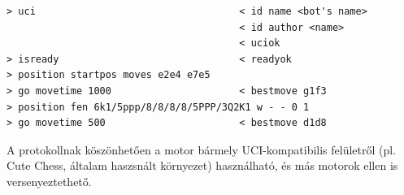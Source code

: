 \begin{lstlisting}[caption={UCI munkamenet (bemenet és a motor válaszai)}, label={lst:uci}]
> uci                                   < id name <bot's name>
                                        < id author <name>
                                        < uciok
> isready                               < readyok
> position startpos moves e2e4 e7e5
> go movetime 1000                      < bestmove g1f3
> position fen 6k1/5ppp/8/8/8/8/5PPP/3Q2K1 w - - 0 1
> go movetime 500                       < bestmove d1d8
\end{lstlisting}

A protokollnak köszönhetően a motor bármely UCI-kompatibilis felületről (pl. Cute Chess, általam haszsnált környezet) használható, és más motorok ellen is versenyeztethető.
